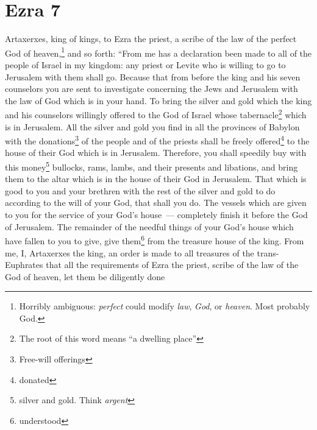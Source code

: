 \section{Ezra 7}\label{Ezra 7}
\begin{enumerate}
     Artaxerxes, king of kings, to Ezra the priest, a scribe of the law of the perfect God of heaven,\footnote{Horribly ambiguous: \emph{perfect} could modify \emph{law}, \emph{God}, or \emph{heaven}. Most probably God.} and so forth:%
     ``From me has a declaration been made to all of the people of Israel in my kingdom: any priest or Levite who is willing to go to Jerusalem with them shall go.%
     Because that from before the king and his seven counselors you are sent to investigate concerning the Jews and Jerusalem with the law of God which is in your hand.%
     To bring the silver and gold which the king and his counselors willingly offered to the God of Israel whose tabernacle\footnote{The root of this word means ``a dwelling place''} which is in Jerusalem.%
     All the silver and gold you find in all the provinces of Babylon with the donations\footnote{Free-will offerings} of the people and of the priests shall be freely offered\footnote{donated} to the house of their God which is in Jerusalem.%
     Therefore, you shall speedily buy with this money\footnote{silver and gold. Think \emph{argent}} bullocks, rams, lambs, and their presents and libations, and bring them to the altar which is in the house of their God in Jerusalem.%
     That which is good to you and your brethren with the rest of the silver and gold to do according to the will of your God, that shall you do.%
     The vessels which are given to you for the service of your God's house~--- completely finish it before the God of Jerusalem.%
     The remainder of the needful things of your God's house which have fallen to you to give, give them\footnote{understood} from the treasure house of the king.%
     From me, I, Artaxerxes the king, an order is made to all treasures of the trans-Euphrates that all the requirements of Ezra the priest, scribe of the law of the God of heaven, let them be diligently done%

\end{enumerate}
